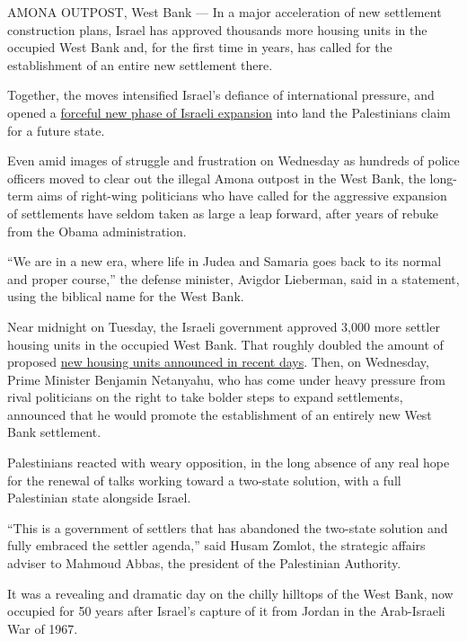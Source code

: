 AMONA OUTPOST, West Bank --- In a major acceleration of new settlement
construction plans, Israel has approved thousands more housing units in
the occupied West Bank and, for the first time in years, has called for
the establishment of an entire new settlement there.

Together, the moves intensified Israel's defiance of international
pressure, and opened a
\href{https://www.nytimes.com/2017/01/24/world/middleeast/israel-settlement-expansion-west-bank.html}{forceful
new phase of Israeli expansion} into land the Palestinians claim for a
future state.

Even amid images of struggle and frustration on Wednesday as hundreds of
police officers moved to clear out the illegal Amona outpost in the West
Bank, the long-term aims of right-wing politicians who have called for
the aggressive expansion of settlements have seldom taken as large a
leap forward, after years of rebuke from the Obama administration.

``We are in a new era, where life in Judea and Samaria goes back to its
normal and proper course,'' the defense minister, Avigdor Lieberman,
said in a statement, using the biblical name for the West Bank.

Near midnight on Tuesday, the Israeli government approved 3,000 more
settler housing units in the occupied West Bank. That roughly doubled
the amount of proposed
\href{https://www.nytimes.com/2017/01/24/world/middleeast/israel-settlement-expansion-west-bank.html}{new
housing units announced in recent days}. Then, on Wednesday, Prime
Minister Benjamin Netanyahu, who has come under heavy pressure from
rival politicians on the right to take bolder steps to expand
settlements, announced that he would promote the establishment of an
entirely new West Bank settlement.

Palestinians reacted with weary opposition, in the long absence of any
real hope for the renewal of talks working toward a two-state solution,
with a full Palestinian state alongside Israel.

``This is a government of settlers that has abandoned the two-state
solution and fully embraced the settler agenda,'' said Husam Zomlot, the
strategic affairs adviser to Mahmoud Abbas, the president of the
Palestinian Authority.

It was a revealing and dramatic day on the chilly hilltops of the West
Bank, now occupied for 50 years after Israel's capture of it from Jordan
in the Arab-Israeli War of 1967.

